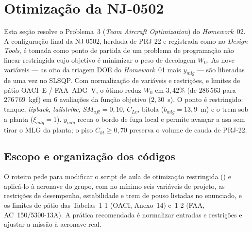 
\section{Otimização da NJ-0502}
\label{sec:nj0502}

\noindent
Esta seção resolve o Problema~3 (\emph{Team Aircraft Optimization}) do
\emph{Homework}~02. A configuração final da NJ-0502, herdada de PRJ-22 e
registrada como  no \emph{Design Tools}, é tomada como
ponto de partida de um problema de programação não linear restringida
cujo objetivo é minimizar o peso de decolagem $W_0$. As nove variáveis
--- as oito da triagem DOE do \emph{Homework}~01 mais $y_{mlg}$ --- são
liberadas de uma vez no SLSQP. Com normalização de variáveis e
restrições, e limites de pátio OACI~E / FAA~ADG~V, o ótimo reduz
$W_0$ em $3{,}42\%$ (de $286\,563$ para $276\,769$~kgf) em 6 avaliações
da função objetivo ($2{,}30$~s). O ponto é restringido: tanque,
\emph{tipback}, \emph{tailstrike}, $SM_{aft}=0{,}10$, $C_{Lv}$, bitola
($b_{mlg}=13{,}9$~m) e o trem sob a planta ($\xi_{mlg}=1$). $y_{mlg}$ recua
o bordo de fuga local e permite avançar a asa sem tirar o MLG da planta;
o piso $C_{ht}\ge 0{,}70$ preserva o volume de cauda de PRJ-22.

\subsection{Escopo e organização dos códigos}
\label{sec:p3escopo}

O roteiro pede para modificar o script de aula de otimização restringida
() e aplicá-lo à aeronave do grupo, com no
mínimo seis variáveis de projeto, as restrições de desempenho,
estabilidade e trem de pouso listadas no enunciado, e os limites de pátio
das Tabelas~1-1 (OACI, Anexo~14) e~1-2 (FAA, AC~150/5300-13A). A prática
recomendada é normalizar entradas e restrições e ajustar a missão
à aeronave real.

